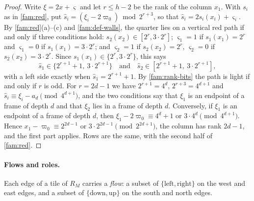 \begin{proof}
Write $\xi=2x+\varsigma$ and let $r\le h-2$ be the rank of the column $x_1$. With $s_i$ as in \cref{fam:red}, put $\hat s_i=(\xi_i-2\varpi_0)\bmod2^{r+3}$, so that $\hat s_i=2s_i(x_i)+\varsigma_i$. By \cref{fam:red}(a)--(c) and \cref{fam:def-walls}, the quarter lies on a vertical red path if and only if three conditions hold: $s_2(x_2)\in[2^r,3\cdot2^r]$; $\varsigma_1=1$ if $s_1(x_1)=2^r$ and $\varsigma_1=0$ if $s_1(x_1)=3\cdot2^r$; and $\varsigma_2=1$ if $s_2(x_2)=2^r$, $\varsigma_2=0$ if $s_2(x_2)=3\cdot2^r$. Since $s_1(x_1)\in\{2^r,3\cdot2^r\}$, this says
\[
\hat s_1\in\{2^{r+1}+1,\ 3\cdot2^{r+1}\}\quad\text{and}\quad \hat s_2\in[2^{r+1}+1,\ 3\cdot2^{r+1}],
\]
with a left side exactly when $\hat s_1=2^{r+1}+1$. By \cref{fam:rank-bits} the path is light if and only if $r$ is odd. For $r=2d-1$ we have $2^{r+1}=4^d$, $2^{r+3}=4^{d+1}$ and $\hat s_i\equiv\xi_i-a_d\pmod{4^{d+1}}$, and the two conditions say that $\xi_1$ is an endpoint of a frame of depth $d$ and that $\xi_2$ lies in a frame of depth $d$. Conversely, if $\xi_1$ is an endpoint of a frame of depth $d$, then $\xi_1-2\varpi_0\equiv4^d+1$ or $3\cdot4^d\pmod{4^{d+1}}$. Hence $x_1-\varpi_0\equiv2^{2d-1}$ or $3\cdot2^{2d-1}\pmod{2^{2d+1}}$, the column has rank $2d-1$, and the first part applies. Rows are the same, with the second half of \cref{fam:red}.
\end{proof}

\paragraph{Flows and roles.} Each edge of a tile of $R_M$ carries a \emph{flow}: a subset of $\{\mathrm{left},\mathrm{right}\}$ on the west and east edges, and a subset of $\{\mathrm{down},\mathrm{up}\}$ on the south and north edges.

